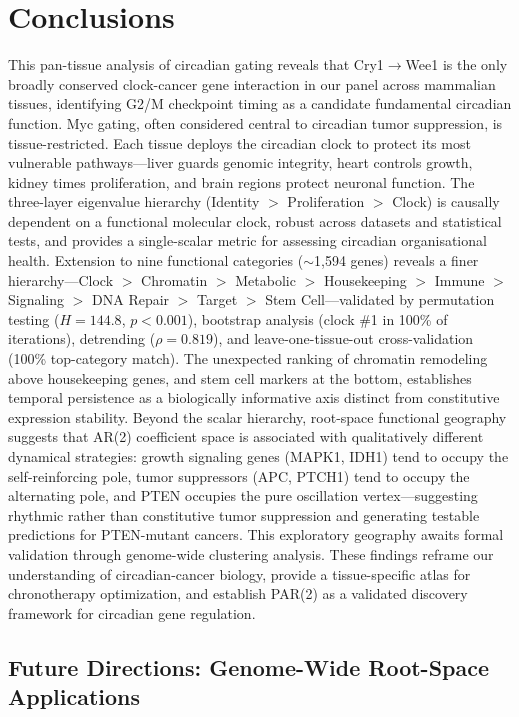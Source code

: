 \documentclass[11pt,letterpaper]{article}
\begin{document}
\section{Conclusions}

This pan-tissue analysis of circadian gating reveals that Cry1$\rightarrow$Wee1 is the only broadly conserved clock-cancer gene interaction in our panel across mammalian tissues, identifying G2/M checkpoint timing as a candidate fundamental circadian function. Myc gating, often considered central to circadian tumor suppression, is tissue-restricted. Each tissue deploys the circadian clock to protect its most vulnerable pathways---liver guards genomic integrity, heart controls growth, kidney times proliferation, and brain regions protect neuronal function. The three-layer eigenvalue hierarchy (Identity $>$ Proliferation $>$ Clock) is causally dependent on a functional molecular clock, robust across datasets and statistical tests, and provides a single-scalar metric for assessing circadian organisational health. Extension to nine functional categories ($\sim$1,594 genes) reveals a finer hierarchy---Clock $>$ Chromatin $>$ Metabolic $>$ Housekeeping $>$ Immune $>$ Signaling $>$ DNA Repair $>$ Target $>$ Stem Cell---validated by permutation testing ($H=144.8$, $p<0.001$), bootstrap analysis (clock \#1 in 100\% of iterations), detrending ($\rho = 0.819$), and leave-one-tissue-out cross-validation (100\% top-category match). The unexpected ranking of chromatin remodeling above housekeeping genes, and stem cell markers at the bottom, establishes temporal persistence as a biologically informative axis distinct from constitutive expression stability. Beyond the scalar hierarchy, root-space functional geography suggests that AR(2) coefficient space is associated with qualitatively different dynamical strategies: growth signaling genes (MAPK1, IDH1) tend to occupy the self-reinforcing pole, tumor suppressors (APC, PTCH1) tend to occupy the alternating pole, and PTEN occupies the pure oscillation vertex---suggesting rhythmic rather than constitutive tumor suppression and generating testable predictions for PTEN-mutant cancers. This exploratory geography awaits formal validation through genome-wide clustering analysis. These findings reframe our understanding of circadian-cancer biology, provide a tissue-specific atlas for chronotherapy optimization, and establish PAR(2) as a validated discovery framework for circadian gene regulation.

\subsection*{Future Directions: Genome-Wide Root-Space Applications}
\end{document}
